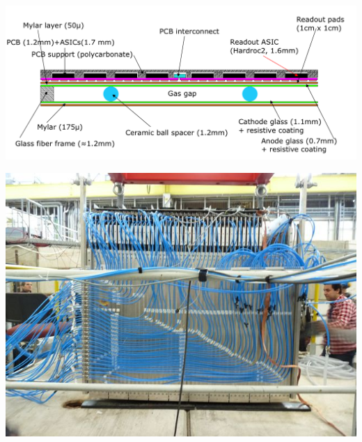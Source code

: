 \documentclass[8pt]{beamer}
\begin{document}
\begin{frame}
\begin{minipage}{0.58\linewidth}
      \begin{center}
        \includegraphics[width=0.9\linewidth]{GRPC-K7.png}      
      \end{center}
    \end{minipage} \hfill
    \begin{minipage}{0.4\linewidth}
      \begin{center}
        \includegraphics[width=0.7\linewidth]{sdhcal_testbeam.jpg}
      \end{center}
    \end{minipage}
  \end{frame}
\end{document}
